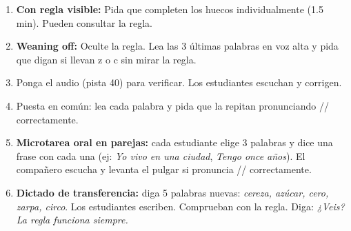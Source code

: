 \documentclass[a4paper,11pt]{article}
\begin{document}
\begin{enumerate}[leftmargin=1.5cm, itemsep=4pt]
\item \textbf{Con regla visible:} Pida que completen los huecos individualmente (1.5 min). Pueden consultar la regla.
\item \textbf{Weaning off:} Oculte la regla. Lea las 3 últimas palabras en voz alta y pida que digan si llevan z o c sin mirar la regla.
\item Ponga el audio (pista 40) para verificar. Los estudiantes escuchan y corrigen.
\item Puesta en común: lea cada palabra y pida que la repitan pronunciando /\texttheta/ correctamente.
\item \textbf{Microtarea oral en parejas:} cada estudiante elige 3 palabras y dice una frase con cada una (ej: \textit{Yo vivo en una ciudad}, \textit{Tengo once años}). El compañero escucha y levanta el pulgar si pronuncia /\texttheta/ correctamente.
\item \textbf{Dictado de transferencia:} diga 5 palabras nuevas: \textit{cereza, azúcar, cero, zarpa, circo}. Los estudiantes escriben. Comprueban con la regla. Diga: \textit{¿Veis? La regla funciona siempre.}
\end{enumerate}
\end{document}
